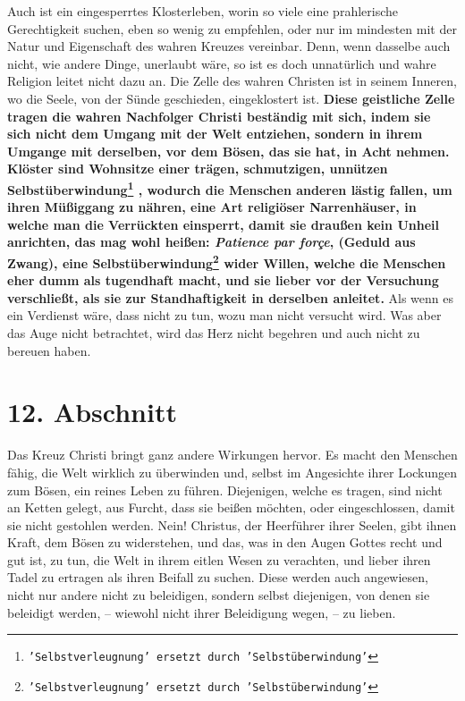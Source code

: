 Auch ist ein eingesperrtes Klosterleben, worin so viele eine
prahlerische
Gerechtigkeit suchen, eben so wenig zu empfehlen, oder nur im mindesten mit der
Natur und Eigenschaft des wahren Kreuzes vereinbar. Denn, wenn dasselbe auch
nicht, wie andere Dinge, unerlaubt wäre, so ist es doch unnatürlich und wahre
Religion leitet nicht dazu an. Die Zelle des wahren Christen ist in seinem
Inneren, wo die Seele, von der Sünde geschieden, eingeklostert ist.
\label{ref:05_11_kloster} \textbf{Diese
geistliche Zelle tragen die wahren Nachfolger Christi beständig mit sich, indem
sie sich nicht dem Umgang mit der Welt entziehen, sondern in ihrem Umgange mit
derselben, vor dem Bösen, das sie hat, in Acht nehmen. Klöster sind Wohnsitze
einer trägen, schmutzigen, unnützen
Selbstüberwindung\footnote{\texttt{'Selbstverleugnung' ersetzt durch
'Selbstüberwindung'}}
, wodurch die Menschen
anderen lästig fallen, um ihren Müßiggang  zu nähren, eine
Art religiöser Narrenhäuser, in welche man die
Verrückten einsperrt, damit sie draußen kein
Unheil anrichten, das mag wohl heißen: \textit{Patience par forçe}, (Geduld aus
Zwang), eine Selbstüberwindung\footnote{\texttt{'Selbstverleugnung' ersetzt durch
'Selbstüberwindung'}} wider Willen, welche die Menschen eher dumm als
tugendhaft macht, und sie lieber vor der Versuchung verschließt, als sie zur
Standhaftigkeit in derselben anleitet.} Als wenn es ein Verdienst wäre, dass
nicht
zu tun, wozu man nicht versucht wird. Was aber das Auge nicht betrachtet, wird
das Herz nicht begehren und auch nicht zu bereuen haben.

\section{12. Abschnitt} \label{kap5_ab12}

Das Kreuz Christi bringt ganz andere Wirkungen hervor. Es macht den Menschen
fähig, die Welt wirklich zu überwinden und, selbst im Angesichte ihrer Lockungen
zum Bösen, ein reines Leben zu führen. Diejenigen, welche es tragen, sind nicht
an Ketten gelegt, aus Furcht, dass sie beißen möchten, oder eingeschlossen,
damit
sie nicht gestohlen werden. Nein! Christus, der Heerführer ihrer Seelen, gibt
ihnen Kraft, dem Bösen zu widerstehen, und das, was in den Augen Gottes recht
und gut ist, zu tun, die Welt in ihrem eitlen Wesen zu verachten, und lieber
ihren Tadel zu ertragen als ihren Beifall zu suchen.  Diese
werden auch
angewiesen, nicht nur andere nicht zu beleidigen, sondern selbst diejenigen, von
denen sie beleidigt werden, -- wiewohl nicht ihrer Beleidigung wegen, -- zu
lieben.

